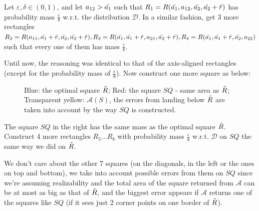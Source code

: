 \documentclass{article}
\newcommand{\<}{\langle}
\renewcommand{\>}{\rangle}
\theoremstyle{definition}
\begin{document}
Let $\varepsilon, \delta \in (0, 1)$, and let $a_{12}>\Tilde{a_1}$ such that $R_1=R(\Tilde{a_1}, a_{12}, \Tilde{a_2}, \Tilde{a_2}+\Tilde{r})$ has probability mass $\frac{\varepsilon}{8}$ w.r.t. the distribution $\mathcal{D}$. In a similar fashion, get 3 more rectangles $R_2 = R(a_{11}, \Tilde{a_1}+\Tilde{r}, \Tilde{a_2}, \Tilde{a_2}+\Tilde{r}), R_3 = R(\Tilde{a_1}, \Tilde{a_1}+\Tilde{r}, a_{21}, \Tilde{a_2}+\Tilde{r}), R_4 = R(\Tilde{a_1}, \Tilde{a_1}+\Tilde{r}, \Tilde{a_2}, a_{22})$ such that every one of them has mass $\frac{\varepsilon}{8}$. 

Until now, the reasoning was identical to that of the axis-aligned rectangles (except for the probability mass of $\frac{\epsilon}{8}$). Now construct one more square as below:

\begin{figure}
    \centering


  \caption{Blue: the optimal square $\Tilde{R}$; Red: the square $SQ$ - same area as $\Tilde{R}$; Transparent yellow: $\mathcal{A}(S)$, the errors from landing below $\Tilde{R}$ are taken into account by the way $SQ$ is constructed.}
  \label{fig:drawing}
\end{figure}

The square $SQ$ in the right has the same mass as the optimal square $\Tilde{R}$. Construct 4 more rectangles $R_5 \dots R_{8}$ with probability mass $\frac{\varepsilon}{8}$ w.r.t. $\mathcal{D}$ on $SQ$ the same way we did on $\Tilde{R}$. 

We don't care about the other 7 squares (on the diagonals, in the left or the ones on top and bottom), we take into account possible errors from them on $SQ$ since we're assuming realizability and the total area of the square returned from $\mathcal{A}$ can be at most as big as that of $\Tilde{R}$, and the biggest error appears if $\mathcal{A}$ returns one of the squares like $SQ$ (if it sees just 2 corner points on one border of $\Tilde{R}$).
\end{document}
